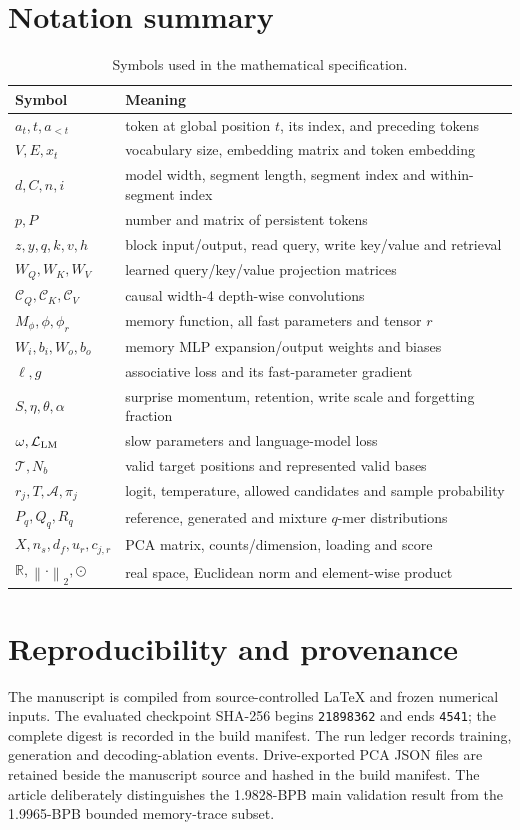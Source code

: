 \documentclass[10pt,twocolumn]{article}
\newcommand{\code}[1]{\texttt{#1}}
\newcommand{\R}{\mathbb{R}}
\newcommand{\norm}[1]{\left\lVert#1\right\rVert}
\newcommand{\had}{\odot}
\begin{document}
\section*{Notation summary}
\begin{table}[H]
\centering
\caption*{Symbols used in the mathematical specification.}
\small
\begin{tabularx}{\columnwidth}{@{}lX@{}}
\toprule
Symbol & Meaning\\
\midrule
$a_t,t,a_{<t}$ & token at global position $t$, its index, and preceding tokens\\
$V,E,x_t$ & vocabulary size, embedding matrix and token embedding\\
$d,C,n,i$ & model width, segment length, segment index and within-segment index\\
$p,P$ & number and matrix of persistent tokens\\
$z,y,q,k,v,h$ & block input/output, read query, write key/value and retrieval\\
$W_Q,W_K,W_V$ & learned query/key/value projection matrices\\
$\mathcal C_Q,\mathcal C_K,\mathcal C_V$ & causal width-4 depth-wise convolutions\\
$M_\phi,\phi,\phi_r$ & memory function, all fast parameters and tensor $r$\\
$W_i,b_i,W_o,b_o$ & memory MLP expansion/output weights and biases\\
$\ell,g$ & associative loss and its fast-parameter gradient\\
$S,\eta,\theta,\alpha$ & surprise momentum, retention, write scale and forgetting fraction\\
$\omega,\mathcal L_{\rm LM}$ & slow parameters and language-model loss\\
$\mathcal T,N_b$ & valid target positions and represented valid bases\\
$r_j,T,\mathcal A,\pi_j$ & logit, temperature, allowed candidates and sample probability\\
$P_q,Q_q,R_q$ & reference, generated and mixture $q$-mer distributions\\
$X,n_s,d_f,u_r,c_{j,r}$ & PCA matrix, counts/dimension, loading and score\\
$\R,\norm{\cdot}_2,\had$ & real space, Euclidean norm and element-wise product\\
\bottomrule
\end{tabularx}
\end{table}

\section*{Reproducibility and provenance}
The manuscript is compiled from source-controlled LaTeX and frozen numerical inputs. The evaluated checkpoint SHA-256 begins \code{21898362} and ends \code{4541}; the complete digest is recorded in the build manifest. The run ledger records training, generation and decoding-ablation events. Drive-exported PCA JSON files are retained beside the manuscript source and hashed in the build manifest. The article deliberately distinguishes the 1.9828-BPB main validation result from the 1.9965-BPB bounded memory-trace subset.
\end{document}
